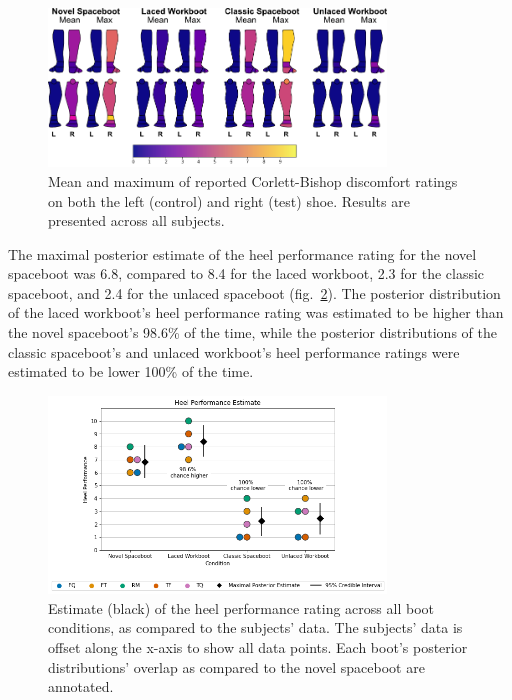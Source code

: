 \documentclass[defaultstyle,11pt]{thesis}
\begin{document}
\hypertarget{fig:SA4-CBresults}{%
\begin{figure}
\centering
\includegraphics[width=0.8\textwidth,height=\textheight]{../fig/SA4/CorlettBishop_Results.png}
\caption[{Corlett-Bishop results}]{Mean and maximum of reported Corlett-Bishop discomfort ratings on both the left (control) and right (test) shoe. Results are presented across all subjects.}
\label{fig:SA4-CBresults}
\end{figure}
}

The maximal posterior estimate of the heel performance rating for the novel spaceboot was 6.8, compared to 8.4 for the laced workboot, 2.3 for the classic spaceboot, and 2.4 for the unlaced spaceboot (fig.~\ref{fig:SA4-HPE}).
The posterior distribution of the laced workboot's heel performance rating was estimated to be higher than the novel spaceboot's 98.6\% of the time, while the posterior distributions of the classic spaceboot's and unlaced workboot's heel performance ratings were estimated to be lower 100\% of the time.

\hypertarget{fig:SA4-HPE}{%
\begin{figure}
\centering
\includegraphics[width=0.8\textwidth,height=\textheight]{../fig/SA4/HeelPerf.png}
\caption[{Heel performance posterior estimate}]{Estimate (black) of the heel performance rating across all boot conditions, as compared to the subjects' data. The subjects' data is offset along the x-axis to show all data points. Each boot's posterior distributions' overlap as compared to the novel spaceboot are annotated.}
\label{fig:SA4-HPE}
\end{figure}
}
\end{document}
